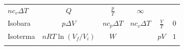 \begin{longtable}[]{@{}lccccc@{}}
\begin{minipage}[t]{0.09\columnwidth}
\(nc_v\Delta T\)\strut
\end{minipage} & \begin{minipage}[t]{0.09\columnwidth}\centering
\(Q\)\strut
\end{minipage} & \begin{minipage}[t]{0.39\columnwidth}\centering
\(\frac{p}{T}\)\strut
\end{minipage} & \begin{minipage}[t]{0.05\columnwidth}\centering
\(\infty\)\strut
\end{minipage}\tabularnewline
\begin{minipage}[t]{0.07\columnwidth}\raggedright
Isobara\strut
\end{minipage} & \begin{minipage}[t]{0.13\columnwidth}\centering
\(p\Delta V\)\strut
\end{minipage} & \begin{minipage}[t]{0.09\columnwidth}\centering
\(nc_p\Delta T\)\strut
\end{minipage} & \begin{minipage}[t]{0.09\columnwidth}\centering
\(nc_v\Delta T\)\strut
\end{minipage} & \begin{minipage}[t]{0.39\columnwidth}\centering
\(\frac{V}{T}\)\strut
\end{minipage} & \begin{minipage}[t]{0.05\columnwidth}\centering
\(0\)\strut
\end{minipage}\tabularnewline
\begin{minipage}[t]{0.07\columnwidth}\raggedright
Isoterma\strut
\end{minipage} & \begin{minipage}[t]{0.13\columnwidth}\centering
\(nRT\ln{(V_f/V_i)}\)\strut
\end{minipage} & \begin{minipage}[t]{0.09\columnwidth}\centering
\(W\)\strut
\end{minipage} & \begin{minipage}[t]{0.09\columnwidth}\centering
0\strut
\end{minipage} & \begin{minipage}[t]{0.39\columnwidth}\centering
\(pV\)\strut
\end{minipage} & \begin{minipage}[t]{0.05\columnwidth}\centering
\(1\)\strut
\end{minipage}\tabularnewline
\begin{minipage}[t]{0.07\columnwidth}\raggedright

\end{minipage}
\end{longtable}
